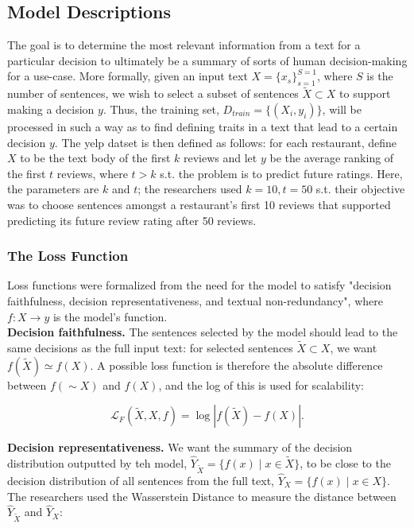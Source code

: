 \documentclass{article}
\begin{document}
\subsection{Model Descriptions}
The goal is to determine the most relevant information from a text for a particular decision to ultimately be a summary of sorts of human decision-making for a use-case. More formally, given an
input text $X = \{x_s\}_{s=1}^{S=1}$, where $S$ is the number of sentences, we wish to select a subset of sentences $\tilde{X}\subset X$ to support making a decision $y$. Thus, the training set,
$D_{train} = \{(X_i, y_i)\}$, will be processed in such a way as to find defining traits in a text that lead to a certain decision $y$. The yelp datset is then defined as follows: for each restaurant,
define $X$ to be the text body of the first $k$ reviews and let $y$ be the average ranking of the first $t$ reviews, where $t > k$ s.t. the problem is to predict future ratings.
Here, the parameters are $k$ and $t$; the researchers used $k = 10, t = 50$ s.t. their objective was to choose sentences amongst a restaurant’s first 10 reviews that supported predicting its future
review rating after 50 reviews.

\subsubsection{The Loss Function}
Loss functions were formalized from the need for the model to satisfy "decision faithfulness, decision representativeness, and textual non-redundancy", where $f:X\to y$ is the model's function. \\

\textbf{Decision faithfulness.} The sentences selected by the model should lead to the same decisions as the full input text: for selected sentences $\tilde{X}\subset X$, we want
$f(\tilde{X})\simeq f(X)$. A possible loss function is therefore the absolute difference between $f(\sim{X})$ and $f(X)$, and the log of this is used for scalability:

\[
    \mathcal{L}_F \left(\tilde{X}, X, f\right) = \log{|f(\tilde{X}) - f(X)|}.
\]

\textbf{Decision representativeness.} We want the summary of the decision distribution outputted by teh model, $\hat{Y}_{\tilde{X}} = \{f(x)\mid x\in\tilde{X}\}$, to be close to the decision
distribution of all sentences from the full text, $\hat{Y}_X = \{f(x)\mid x \in X\}$. The researchers used the Wasserstein Distance to measure the distance between $\hat{Y}_{\tilde{X}}$ and $\hat{Y}_X$:
\end{document}
